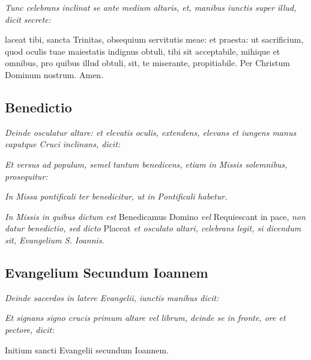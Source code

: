 \divisio

\textit{%
    Tunc celebrans inclinat se ante medium altaris, et, manibus iunctis super
    illud, dicit secrete:
}

laceat tibi, sancta Trinitas, obsequium servitutis meae: et
praesta: ut sacrificium, quod oculis tuae maiestatis indignus obtuli, tibi sit
acceptabile, mihique et omnibus, pro quibus illud obtuli, sit, te miserante,
propitiabile.  Per Christum Dominum nostrum.  Amen.

\subsection{Benedictio}

\textit{%
    Deinde osculatur altare: et elevatis oculis, extendens, elevans et iungens
    manus caputque Cruci inclinans, dicit:
}


\textit{%
    Et versus ad populum, semel tantum benedicens, etiam in Missis solemnibus,
    prosequitur:
}


\divisio

\textit{In Missa pontificali ter benedicitur, ut in Pontificali habetur.}

\textit{In Missis in quibus dictum est} Benedicamus Domino \textit{vel}
Requiescant in pace, \textit{non datur benedictio, sed dicto} Placeat \textit{et
osculato altari, celebrans legit, si dicendum sit, Evangelium S. Ioannis.}

\divisio

\subsection{Evangelium Secundum Ioannem}


\textit{Deinde sacerdos in latere Evangelii, iunctis manibus dicit:}


\textit{%
    Et signans signo crucis primum altare vel librum, deinde se in fronte, ore
    et pectore, dicit:
}

{{\liturgicalfont\fontsize{48}{48}\selectfont\raisebox{-0.3em}{᛭}}}
Initium sancti Evangelii secundum Ioannem.


